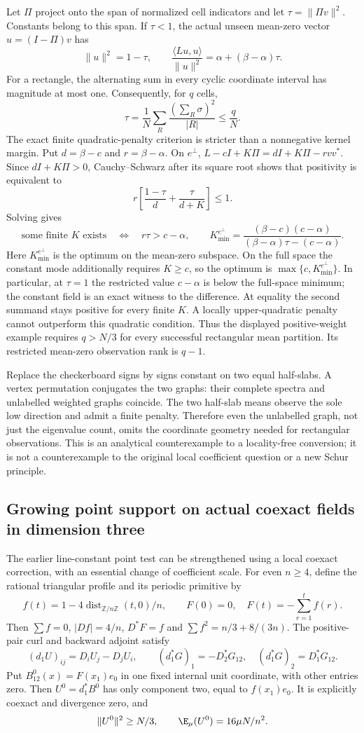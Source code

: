 Let $\Pi$ project onto the span of normalized cell indicators and let
$\tau=\|\Pi v\|^2$. Constants belong to this span. If $\tau<1$, the actual
unseen mean-zero vector $u=(I-\Pi)v$ has
\[
 \|u\|^2=1-\tau,\qquad
 \frac{\langle Lu,u\rangle}{\|u\|^2}
       =\alpha+(\beta-\alpha)\tau.
\]
For a rectangle, the alternating sum in every cyclic coordinate interval
has magnitude at most one. Consequently, for $q$ cells,
\[
 \tau=\frac1N\sum_R\frac{(\sum_R\sigma)^2}{|R|}\leq\frac qN.
\]
The exact finite quadratic-penalty criterion is stricter than a nonnegative
kernel margin. Put $d=\beta-c$ and $r=\beta-\alpha$. On $e^\perp$,
$L-cI+K\Pi=dI+K\Pi-rvv^*$. Since $dI+K\Pi>0$, Cauchy--Schwarz after
its square root shows that positivity is equivalent to
\[
 r\left[\frac{1-\tau}{d}+\frac\tau{d+K}\right]\leq1.
\]
Solving gives
\[
 \text{some finite }K\text{ exists}\quad\Longleftrightarrow\quad
 r\tau>c-\alpha,
 \qquad
 K_{\min}^{e^\perp}=\frac{(\beta-c)(c-\alpha)}{(\beta-\alpha)\tau-(c-\alpha)}.
\]
Here $K_{\min}^{e^\perp}$ is the optimum on the mean-zero subspace.
On the full space the constant mode additionally requires $K\geq c$,
so the optimum is $\max\{c,K_{\min}^{e^\perp}\}$. In particular,
at $\tau=1$ the restricted value $c-\alpha$ is below the full-space
minimum; the constant field is an exact witness to the difference.
At equality the second summand stays positive for every finite $K$.
A locally upper-quadratic penalty cannot outperform this quadratic
condition. Thus the displayed positive-weight example requires $q>N/3$
for every successful rectangular mean partition. Its restricted mean-zero
observation rank is $q-1$.

Replace the checkerboard signs by signs constant on two equal half-slabs.
A vertex permutation conjugates the two graphs: their complete spectra
and unlabelled weighted graphs coincide. The two half-slab means observe
the sole low direction and admit a finite penalty. Therefore even the
unlabelled graph, not just the eigenvalue count, omits the coordinate
geometry needed for rectangular observations. This is an analytical
counterexample to a locality-free conversion; it is not a counterexample
to the original local coefficient question or a new Schur principle.

\subsection{Growing point support on actual coexact fields in dimension three}
The earlier line-constant point test can be strengthened using a local
coexact correction, with an essential change of coefficient scale.
For even $n\geq4$, define the rational triangular profile and its periodic
primitive by
\[
 f(t)=1-4\operatorname{dist}_{\mathbb Z/n\mathbb Z}(t,0)/n,
 \qquad F(0)=0,\quad F(t)=-\sum_{r=1}^t f(r).
\]
Then $\sum f=0$, $|D f|=4/n$, $D^*F=f$ and
$\sum f^2=n/3+8/(3n)$. The positive-pair curl and backward adjoint satisfy
\[
 (d_1U)_{ij}=D_iU_j-D_jU_i,\qquad
 (d_1^*G)_1=-D_2^*G_{12},\quad (d_1^*G)_2=D_1^*G_{12}.
\]
Put $B^0_{12}(x)=F(x_1)e_0$ in one fixed internal unit coordinate, with
other entries zero. Then $U^0=d_1^*B^0$ has only component two, equal to
$f(x_1)e_0$. It is explicitly coexact and divergence zero, and
\[
 \|U^0\|^2\geq N/3,\qquad \E_\mu(U^0)=16\mu N/n^2.
\]


